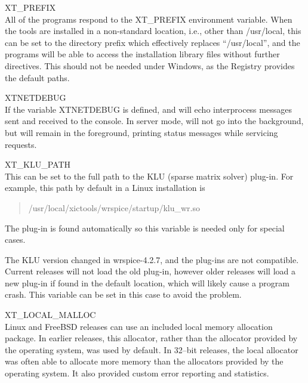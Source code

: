 \begin{description}
\item{\et XT\_PREFIX}\\
All of the {\XicTools} programs respond to the {\et XT\_PREFIX}
environment variable.  When the tools are installed in a non-standard
location, i.e., other than {\vt /usr/local}, this can be set to the
directory prefix which effectively replaces ``{\vt /usr/local}'', and
the programs will be able to access the installation library files
without further directives.  This should not be needed under Windows,
as the Registry provides the default paths.

\item{\et XTNETDEBUG}\\
If the variable {\et XTNETDEBUG} is defined, {\Xic} and {\WRspice}
will echo interprocess messages sent and received to the console.  In
server mode, {\Xic} will not go into the background, but will remain
in the foreground, printing status messages while servicing requests.

\item{\et XT\_KLU\_PATH}\\
This can be set to the full path to the KLU (sparse matrix solver)
plug-in.  For example, this path by default in a Linux installation is
\begin{quote}\vt
/usr/local/xictools/wrspice/startup/klu\_wr.so
\end{quote}
The plug-in is found automatically so this variable is needed only for
special cases. 

The KLU version changed in wrspice-4.2.7, and the plug-ins are not
compatible.  Current {\WRspice} releases will not load the old
plug-in, however older releases will load a new plug-in if found in
the default location, which will likely cause a program crash.  This
variable can be set in this case to avoid the problem.

\item{\et XT\_LOCAL\_MALLOC}\\
Linux and FreeBSD releases can use an included local memory allocation
package.  In earlier {\WRspice} releases, this allocator, rather than
the allocator provided by the operating system, was used by default. 
In 32--bit releases, the local allocator was often able to allocate
more memory than the allocators provided by the operating system.  It
also provided custom error reporting and statistics.


\end{description}
